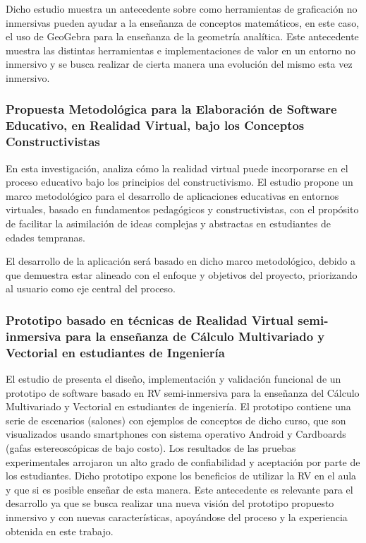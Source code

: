 Dicho estudio muestra un antecedente sobre como herramientas de graficación no inmersivas pueden ayudar a la enseñanza de conceptos matemáticos, en este caso, el uso de GeoGebra para la enseñanza de la geometría analítica. Este antecedente muestra las distintas herramientas e implementaciones de valor en un entorno no inmersivo y se busca realizar de cierta manera una evolución del mismo esta vez inmersivo.

\subsubsection*{Propuesta Metodológica para la Elaboración de Software Educativo, en Realidad Virtual, bajo los Conceptos Constructivistas}
En esta investigación, \citeauthor{fuenmayor} \citeyear{fuenmayor} analiza cómo la realidad virtual puede incorporarse en el proceso educativo bajo los principios del constructivismo. El estudio propone un marco metodológico para el desarrollo de aplicaciones educativas en entornos virtuales, basado en fundamentos pedagógicos y constructivistas, con el propósito de facilitar la asimilación de ideas complejas y abstractas en estudiantes de edades tempranas.

El desarrollo de la aplicación será basado en dicho marco metodológico, debido a que demuestra estar alineado con el enfoque y objetivos del proyecto, priorizando al usuario como eje central del proceso.

\subsubsection*{Prototipo basado en técnicas de Realidad Virtual semi-inmersiva para la enseñanza de Cálculo Multivariado y Vectorial en estudiantes de Ingeniería}
El estudio de \citeauthor{raigoza2017prototipo} \citeyear{raigoza2017prototipo} presenta el diseño, implementación y validación funcional de un prototipo de software basado en RV semi-inmersiva para la enseñanza del Cálculo Multivariado y Vectorial en estudiantes de ingeniería. El prototipo contiene una serie de escenarios (salones) con ejemplos de conceptos de dicho curso, que son visualizados usando smartphones con sistema operativo Android y Cardboards (gafas estereoscópicas de bajo costo). Los resultados de las pruebas experimentales arrojaron un alto grado de confiabilidad y aceptación por parte de los estudiantes. Dicho prototipo expone los beneficios de utilizar la RV en el aula y que si es posible enseñar de esta manera. Este antecedente es relevante para el desarrollo ya que se busca realizar una nueva visión del prototipo propuesto inmersivo y con nuevas características, apoyándose del proceso y la experiencia obtenida en este trabajo.


